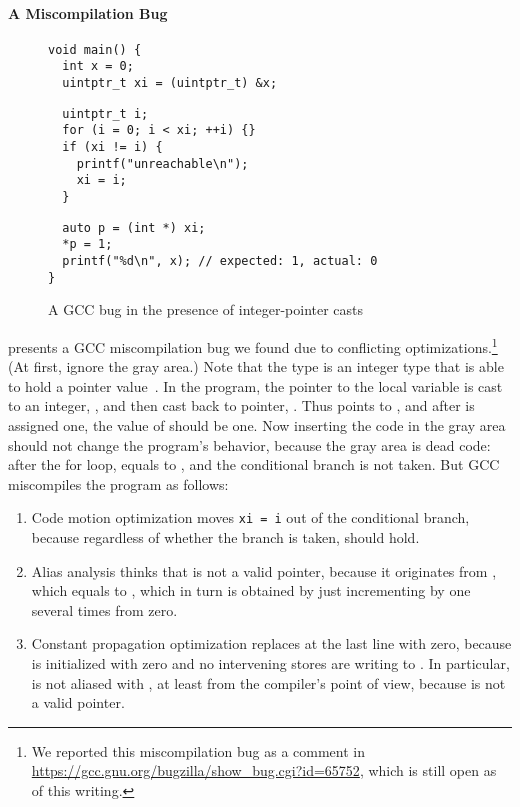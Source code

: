 \paragraph{A Miscompilation Bug}


\begin{figure}[t]
\begin{center}
\small
\begin{minipage}{0.5\textwidth}
\begin{verbatim}
void main() { 
  int x = 0;
  uintptr_t xi = (uintptr_t) &x;
\end{verbatim}
\vskip -0.7cm
\begin{verbatim}
  uintptr_t i;
  for (i = 0; i < xi; ++i) {}
  if (xi != i) {
    printf("unreachable\n");
    xi = i;
  }
\end{verbatim}
\vskip -0.7cm
\begin{verbatim}
  auto p = (int *) xi;
  *p = 1;
  printf("%d\n", x); // expected: 1, actual: 0
}
\end{verbatim}
\end{minipage}
\end{center}
\caption{A GCC bug in the presence of integer-pointer casts}
\label{fig:introduction:bug}
\end{figure}

 presents a GCC miscompilation bug we found due to conflicting
optimizations.\footnote{We reported this miscompilation bug as a comment in
  \url{https://gcc.gnu.org/bugzilla/show_bug.cgi?id=65752}, which is still open as of this writing.}
(At first, ignore the gray area.)  Note that the type  is an integer type that is
able to hold a pointer value~\cite[\S7.20.1.4]{c18}.  In the program, the pointer to the local
variable  is cast to an integer, , and then cast back to pointer, .  Thus
 points to , and after  is assigned one, the value of  should be
one.  Now inserting the code in the gray area should not change the program's behavior, because the
gray area is dead code: after the for loop,  equals to , and the conditional branch
is not taken.  But GCC miscompiles the program as follows:
%
\begin{enumerate}
\item Code motion optimization moves \texttt{xi = i} out of the conditional branch, because
  regardless of whether the branch is taken,  should hold.
\item Alias analysis thinks that  is not a valid pointer, because it originates from
  , which equals to , which in turn is obtained by just incrementing by one several
  times from zero.
\item Constant propagation optimization replaces  at the last line with zero, because
   is initialized with zero and no intervening stores are writing to .  In
  particular,  is not aliased with , at least from the compiler's point of view,
  because  is not a valid pointer.
\end{enumerate}

